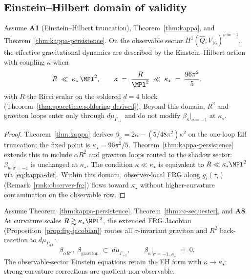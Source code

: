 \subsection{Einstein--Hilbert domain of validity}
\label{sec:wave5-thread2:eh}

\begin{theorem}
\label{thm:thread-2-curvature}
Assume \textbf{A1} (Einstein--Hilbert truncation), Theorem~\ref{thm:kappa},
and Theorem~\ref{thm:kappa-persistence}. On the observable sector
$H^1(\hat Q,V_{16})^{\sigma=-1}$, the effective gravitational dynamics are
described by the Einstein--Hilbert action with coupling $\kappa$ when
\begin{equation}\label{eq:thread2-eh-domain}
  R
  \;\ll\;
  \kappa_\star\,\MPl^2,
  \qquad
  \kappa
  \;=\;
  \frac{R}{\MPl^2}
  \;\ll\;
  \kappa_\star
  \;=\;
  \frac{96\pi^2}{5},
\end{equation}
with $R$ the Ricci scalar on the soldered $d=4$ block
(Theorem~\ref{thm:spacetime:soldering-derived}). Beyond this domain,
$R^2$ and graviton loops enter only through $d\mu_{\Gamma_{+1}}$ and do not
modify $\beta_\kappa|_{\sigma=-1}$ at $\kappa_\star$.
\end{theorem}

\begin{proof}
Theorem~\ref{thm:kappa} derives $\beta_\kappa=2\kappa-(5/48\pi^2)\kappa^2$ on
the one-loop EH truncation; the fixed point is $\kappa_\star=96\pi^2/5$.
Theorem~\ref{thm:kappa-persistence} extends this to include $\alpha R^2$ and
graviton loops routed to the shadow sector: $\beta_\kappa|_{\sigma=-1}$ is
unchanged at $\kappa_\star$. The condition $\kappa\ll\kappa_\star$ is
equivalent to $R\ll\kappa_\star\MPl^2$ via \eqref{eq:kappa-def}. Within this
domain, observer-local FRG along $g_\iota(\tau_\iota)$
(Remark~\ref{rmk:observer-frg}) flows toward $\kappa_\star$ without
higher-curvature contamination on the observable row.
\end{proof}

\begin{proposition}
\label{prop:thread-2-shadow-routing}
Assume Theorem~\ref{thm:kappa-persistence}, Theorem~\ref{thm:cc-sequester},
and \textbf{A8}. At curvature scales $R\gtrsim\kappa_\star\MPl^2$, the
extended FRG Jacobian (Proposition~\ref{prop:frg-jacobian}) routes all
$\sigma$-invariant graviton and $R^2$ back-reaction to
$d\mu_{\Gamma_{+1}}$:
\begin{equation}\label{eq:thread2-shadow-routing}
  \beta_{\alpha R^2},\;
  \beta_{\mathrm{graviton}}
  \;\subset\;
  d\mu_{\Gamma_{+1}},
  \qquad
  \beta_\kappa\big|_{\sigma=-1,\,\kappa_\star}
  \;=\;
  0.
\end{equation}
The observable-sector Einstein equations retain the EH form with
$\kappa\to\kappa_\star$; strong-curvature corrections are quotient-non-observable.
\end{proposition}

